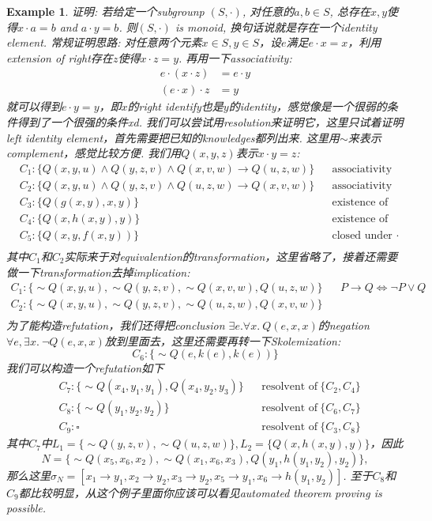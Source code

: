 \documentclass{article}
\theoremstyle{plain}
\newtheorem{example}[theorem]{Example}
\theoremstyle{nonumberplain}
\begin{document}

\begin{example}
\rm 证明: 若给定一个subgrounp $(S,\cdot)$, 对任意的$a,b \in S$, 总存在$x,y$使得$x \cdot a = b$ and $a \cdot y = b$. 则$(S,\cdot)$ is monoid, 换句话说就是存在一个identity element. 常规证明思路: 对任意两个元素$x \in S,y \in S$，设$e$满足$e \cdot x = x$，利用extension of right存在$z$使得$x \cdot z = y$. 再用一下associativity:
\[
	\begin{aligned}
	e \cdot (x \cdot z) &= e \cdot y \\
	(e \cdot x) \cdot z &= y
	\end{aligned}
\]
就可以得到$e \cdot y = y$，即$x$的right identify也是$y$的identity，感觉像是一个很弱的条件得到了一个很强的条件xd. 我们可以尝试用resolution来证明它，这里只试着证明left identity element，首先需要把已知的knowledges都列出来. 这里用$\sim$来表示complement，感觉比较方便. 我们用$Q(x,y,z)$表示$x \cdot y = z$: 
\[
	\begin{aligned}
		&C_1: \{Q(x,y,u)\wedge Q(y,z,v) \wedge Q(x,v,w) \to Q(u,z,w)\} && \text{associativity} \\
		&C_2: \{Q(x,y,u)\wedge Q(y,z,v) \wedge Q(u,z,w) \to Q(x,v,w)\} && \text{associativity} \\
		&C_3: \{Q(g(x,y), x, y)\} && \text{existence of left}  \\
		&C_4: \{Q(x, h(x,y), y)\} && \text{existence of right} \\
		&C_5: \{Q(x,y, f(x,y))\} && \text{closed under $\cdot$} \\ 
	\end{aligned}
\]
其中$C_1$和$C_2$实际来于对equivalention的transformation，这里省略了，接着还需要做一下transformation去掉implication:
\[
	\begin{aligned}
		C_1: \{\sim Q(x,y,u), \sim Q(y,z,v), \sim Q(x,v,w), Q(u,z,w)\} && P \to Q \iff \neg P \vee Q \\
		C_2: \{\sim Q(x,y,u), \sim Q(y,z,v), \sim Q(u,z,w), Q(x,v,w)\} \\ 
	\end{aligned}
\]
为了能构造refutation，我们还得把conclusion $\exists e. \forall x.~ Q(e,x,x)$的negation $\forall e, \exists x.~ \neg Q(e,x,x)$放到里面去，这里还需要再转一下Skolemization:
\[
	C_6:\{\sim Q(e, k(e), k(e))\}
\]
我们可以构造一个refutation如下
\[
	\begin{aligned}
	& C_7:\{\sim Q(x_4, y_1, y_1), Q(x_4, y_2, y_3)\}  && \text{resolvent of}~\{C_2,C_4\}\\
	& C_8:\{\sim Q(y_1, y_2, y_2)\} && \text{resolvent of}~\{C_6,C_7\}\\
	& C_9: \square && \text{resolvent of}~\{C_3,C_8\}
	\end{aligned}
\]
其中$C_7$中$L_1 = \{\sim Q(y,z,v), \sim Q(u,z,w)\}, L_2 = \{Q(x, h(x,y), y)\}$，因此
\[
N = \{\sim Q(x_5,x_6,x_2), \sim Q(x_1,x_6,x_3), Q(y_1, h(y_1,y_2), y_2)\},
\]
那么这里$\sigma_N =[x_1 \to y_1, x_2 \to y_2, x_3 \to y_2, x_5 \to y_1, x_6 \to h(y_1,y_2)]$. 至于$C_8$和$C_9$都比较明显，从这个例子里面你应该可以看见automated theorem proving is possible.
\end{example}
\end{document}
